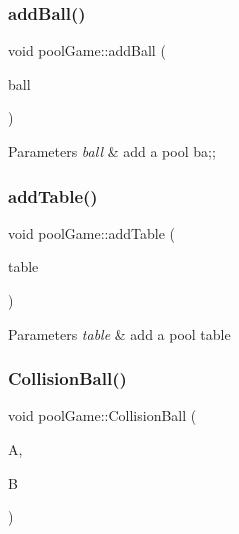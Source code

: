 \subsubsection{\texorpdfstring{add\+Ball()}{addBall()}}
{\footnotesize\ttfamily void pool\+Game\+::add\+Ball (\begin{DoxyParamCaption}\item[{\mbox{\hyperlink{classpool_ball}{pool\+Ball}} $\ast$}]{ball }\end{DoxyParamCaption})\hspace{0.3cm}{\ttfamily [inline]}}


\begin{DoxyParams}{Parameters}
{\em ball} & add a pool ba;; \\
\hline
\end{DoxyParams}
\mbox{\label{classpool_game_a2f5550cf716aacfd50995fb73cb6602f}} 
\subsubsection{\texorpdfstring{add\+Table()}{addTable()}}
{\footnotesize\ttfamily void pool\+Game\+::add\+Table (\begin{DoxyParamCaption}\item[{\mbox{\hyperlink{classpool_table}{pool\+Table}} $\ast$}]{table }\end{DoxyParamCaption})\hspace{0.3cm}{\ttfamily [inline]}}


\begin{DoxyParams}{Parameters}
{\em table} & add a pool table \\
\hline
\end{DoxyParams}
\mbox{\label{classpool_game_a2b907f407d0de6644271b4e1a66a4f3c}} 
\subsubsection{\texorpdfstring{Collision\+Ball()}{CollisionBall()}}
{\footnotesize\ttfamily void pool\+Game\+::\+Collision\+Ball (\begin{DoxyParamCaption}\item[{\mbox{\hyperlink{classpool_ball}{pool\+Ball}} $\ast$}]{A,  }\item[{\mbox{\hyperlink{classpool_ball}{pool\+Ball}} $\ast$}]{B }\end{DoxyParamCaption})\hspace{0.3cm}{\ttfamily [inline]}}


